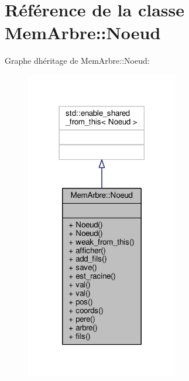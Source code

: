 \hypertarget{classMemArbre_1_1Noeud}{}\section{Référence de la classe Mem\+Arbre\+:\+:Noeud}
\label{classMemArbre_1_1Noeud}


Graphe d\textquotesingle{}héritage de Mem\+Arbre\+:\+:Noeud\+:\nopagebreak
\begin{figure}[H]
\begin{center}
\leavevmode
\includegraphics[width=189pt]{classMemArbre_1_1Noeud__inherit__graph}
\end{center}
\end{figure}


